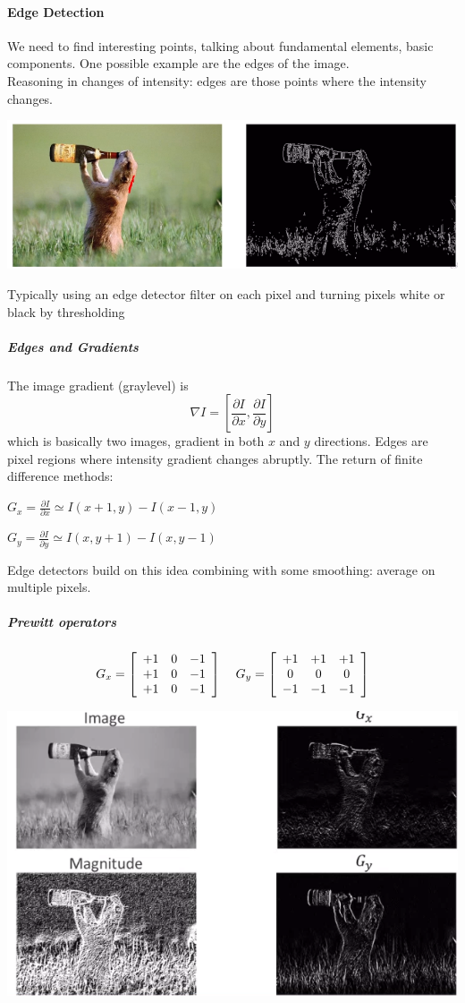 \documentclass[10pt]{report}
\begin{document}
\paragraph{Edge Detection} We need to find interesting points, talking about fundamental elements, basic components. One possible example are the edges of the image.\\
Reasoning in changes of intensity: edges are those points where the intensity changes.\begin{center}
	\includegraphics[scale=0.5]{4.png}
\end{center}
Typically using an edge detector filter on each pixel and turning pixels white or black by thresholding
\subparagraph{Edges and Gradients} The image gradient (graylevel) is $$\nabla I = \left[\frac{\partial I}{\partial x},\frac{\partial I}{\partial y}\right]$$ which is basically two images, gradient in both $x$ and $y$ directions. Edges are pixel regions where intensity gradient changes abruptly. The return of finite difference methods:
\begin{list}{}{}
	\item $G_x = \frac{\partial I}{\partial x} \simeq I(x+1,y)-I(x-1,y)$
	\item $G_y = \frac{\partial I}{\partial y} \simeq I(x,y+1)-I(x,y-1)$
\end{list}
Edge detectors build on this idea combining with some smoothing: average on multiple pixels.
\subparagraph{Prewitt operators}
$$G_x = \left[\begin{array}{c c c }
+1&0&-1\\
+1&0&-1\\
+1&0&-1
\end{array}\right]\:\:\:\:\:G_y = \left[\begin{array}{c c c }
+1&+1&+1\\
0&0&0\\
-1&-1&-1
\end{array}\right]$$
\begin{center}
	\includegraphics[scale=0.5]{5.png}
\end{center}
\end{document}
